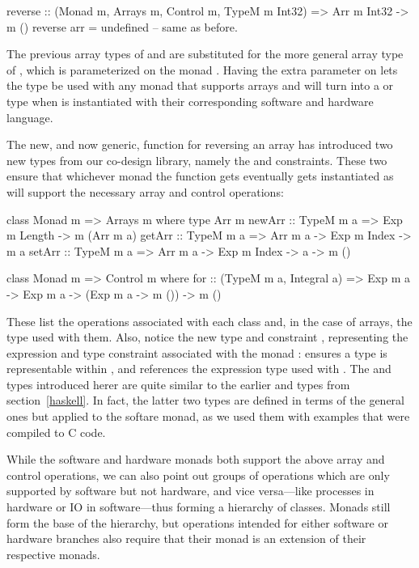 \documentclass[../main.tex]{subfiles}
\begin{document}
\begin{code}
reverse :: (Monad m, Arrays m, Control m, TypeM m Int32)
  => Arr m Int32 -> m ()
reverse arr = undefined -- same as before.
\end{code}

\noindent The previous array types of  and  are substituted for the more general array type of , which is parameterized on the monad . Having the extra parameter on  lets the type be used with any monad that supports arrays and will turn into a  or  type when  is instantiated with their corresponding software and hardware language.

The new, and now generic, function for reversing an array has introduced two new types from our co-design library, namely the  and  constraints. These two ensure that whichever monad the function gets eventually gets instantiated as will support the necessary array and control operations:

\begin{code}
class Monad m => Arrays m where
  type Arr m
  newArr :: TypeM m a => Exp m Length -> m (Arr m a)
  getArr :: TypeM m a => Arr m a -> Exp m Index -> m a
  setArr :: TypeM m a => Arr m a -> Exp m Index -> a -> m ()

class Monad m => Control m where
  for :: (TypeM m a, Integral a) => Exp m a -> Exp m a -> (Exp m a -> m ())
      -> m ()
\end{code}

\noindent These list the operations associated with each class and, in the case of arrays, the type used with them. Also, notice the new type  and constraint , representing the expression and type constraint associated with the monad :  ensures a type is representable within , and  references the expression type used with . The  and  types introduced herer are quite similar to the earlier  and  types from section~\ref{haskell}. In fact, the latter two types are defined in terms of the general ones but applied to the softare monad, as we used them with examples that were compiled to C code.

While the software and hardware monads both support the above array and control operations, we can also point out groups of operations which are only supported by software but not hardware, and vice versa---like processes in hardware or IO in software---thus forming a hierarchy of classes. Monads still form the base of the hierarchy, but operations intended for either software or hardware branches also require that their monad is an extension of their respective monads.
\end{document}
